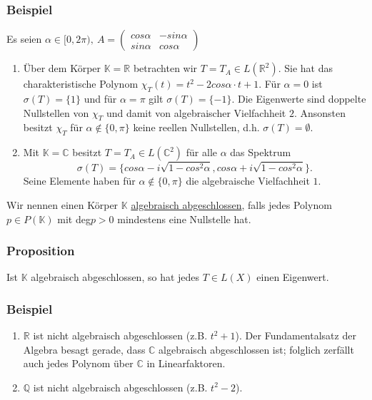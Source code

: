 \subsubsection{Beispiel}
\label{4.3.4}
Es seien $\alpha \in [0,2\pi ),\ A=\begin{pmatrix}cos \alpha & -sin \alpha\\ sin\alpha & cos\alpha \end{pmatrix}$
\begin{enumerate}
\item Über dem Körper $\mathbb{K}=\mathbb{R}$ betrachten wir $T=T_A\in L(\mathbb{R}^2)$.  Sie hat das charakteristische Polynom $\chi _T(t)=t^2-2cos\alpha \cdot t+1$.  Für $\alpha =0$ ist $\sigma (T)=\{1\}$ und für $\alpha = \pi$ gilt $\sigma (T)=\{-1\}$.  Die Eigenwerte sind doppelte Nullstellen von $\chi _T$ und damit von algebraischer Vielfachheit $2$.  Ansonsten besitzt $\chi _T$ für $\alpha \not\in \{0,\pi\}$ keine reellen Nullstellen, d.h. $\sigma (T)=\emptyset$.
\item Mit $\mathbb{K}=\mathbb{C}$ besitzt $T=T_A\in L(\mathbb{C}^2)$ für alle $\alpha$ das Spektrum
\[\sigma (T)=\{cos\alpha -i\sqrt{1-cos^2\alpha }, cos\alpha +i\sqrt{1-cos^2\alpha }\}.\]
Seine Elemente haben für $\alpha\not\in \{0,\pi \}$ die algebraische Vielfachheit $1$.
\end{enumerate}
Wir nennen einen Körper $\mathbb{K}$ \underline{algebraisch abgeschlossen}, falls jedes Polynom $p\in P(\mathbb{K})$ mit deg$p>0$ mindestens eine Nullstelle hat.
\subsubsection{Proposition}
Ist $\mathbb{K}$ algebraisch abgeschlossen, so hat jedes $T\in L(X)$ einen Eigenwert.
\subsubsection{Beispiel}
\begin{enumerate}
\item $\mathbb{R}$ ist nicht algebraisch abgeschlossen (z.B. $t^2 +1$).  Der Fundamentalsatz der Algebra besagt gerade, dass $\mathbb{C}$ algebraisch abgeschlossen ist; folglich zerfällt auch jedes Polynom über $\mathbb{C}$ in Linearfaktoren.
\item $\mathbb{Q}$ ist nicht algebraisch abgeschlossen (z.B. $t^2-2$).
\end{enumerate}

